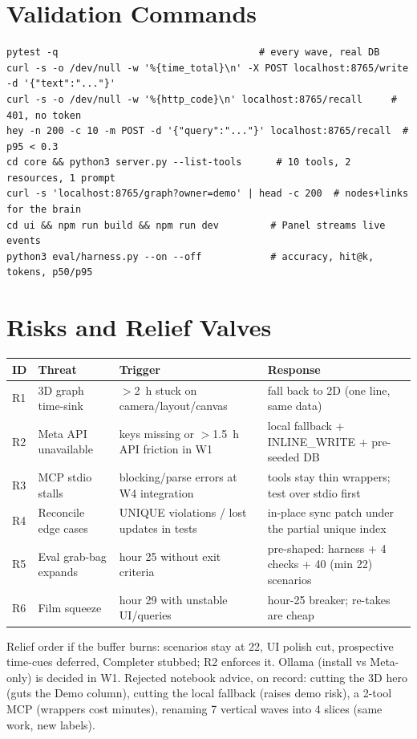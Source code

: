 \section{Validation Commands}
\begin{Verbatim}[breaklines=true,fontsize=\small]
pytest -q                                   # every wave, real DB
curl -s -o /dev/null -w '%{time_total}\n' -X POST localhost:8765/write -d '{"text":"..."}'
curl -s -o /dev/null -w '%{http_code}\n' localhost:8765/recall     # 401, no token
hey -n 200 -c 10 -m POST -d '{"query":"..."}' localhost:8765/recall  # p95 < 0.3
cd core && python3 server.py --list-tools      # 10 tools, 2 resources, 1 prompt
curl -s 'localhost:8765/graph?owner=demo' | head -c 200  # nodes+links for the brain
cd ui && npm run build && npm run dev         # Panel streams live events
python3 eval/harness.py --on --off            # accuracy, hit@k, tokens, p50/p95
\end{Verbatim}

\section{Risks and Relief Valves}
\begin{longtable}{@{}p{}p{}p{}p{}@{}}
\toprule
ID & Threat & Trigger & Response \\
\midrule
R1 & 3D graph time-sink & $>$2~h stuck on camera/layout/canvas & fall back to 2D (one line, same data) \\
R2 & Meta API unavailable & keys missing or $>$1.5~h API friction in W1 & local fallback + INLINE\_WRITE + pre-seeded DB \\
R3 & MCP stdio stalls & blocking/parse errors at W4 integration & tools stay thin wrappers; test over stdio first \\
R4 & Reconcile edge cases & UNIQUE violations / lost updates in tests & in-place sync patch under the partial unique index \\
R5 & Eval grab-bag expands & hour 25 without exit criteria & pre-shaped: harness + 4 checks + 40 (min 22) scenarios \\
R6 & Film squeeze & hour 29 with unstable UI/queries & hour-25 breaker; re-takes are cheap \\
\bottomrule
\end{longtable}
Relief order if the buffer burns: scenarios stay at 22, UI polish cut, prospective time-cues
deferred, Completer stubbed; R2 enforces it. Ollama (install vs Meta-only) is decided in W1.
Rejected notebook advice, on record: cutting the 3D hero (guts the Demo column), cutting the
local fallback (raises demo risk), a 2-tool MCP (wrappers cost minutes), renaming 7 vertical
waves into 4 slices (same work, new labels).
